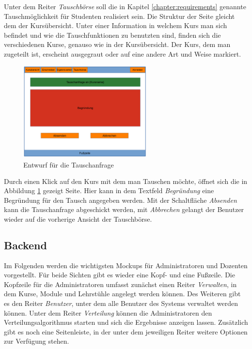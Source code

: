             Unter dem Reiter \textit{Tauschbörse} soll die in Kapitel \ref{chapter:requirements} genannte Tauschmöglichkeit für Studenten realisiert sein.
            Die Struktur der Seite gleicht dem der Kursübersicht.
            Unter einer Information in welchem Kurs man sich befindet und wie die Tauschfunktionen zu benutzten sind, finden sich die verschiedenen Kurse, genauso wie in der Kursübersicht.
            Der Kurs, dem man zugeteilt ist, erscheint ausgegraut oder auf eine andere Art und Weise markiert.
            
            \begin{figure}[t]
            	\centering
            	\includegraphics[width=0.6\textwidth]{./design/images/MockUpsFrontend/frontendSwap2.png}
            	\caption{Entwurf für die Tauschanfrage}
            	\label{fig:mockupResultsSwap2}
            \end{figure}
            
            Durch einen Klick auf den Kurs mit dem man Tauschen möchte, öffnet sich die in Abbildung \ref{fig:mockupResultsSwap2} gezeigt Seite.
            Hier kann in dem Textfeld \textit{Begründung} eine Begründung für den Tausch angegeben werden.
            Mit der Schaltfläche \textit{Absenden} kann die Tauschanfrage abgeschickt werden, mit \textit{Abbrechen} gelangt der Benutzer wieder auf die vorherige Ansicht der Tauschbörse.
            
            
            
        
            
            
    
        \subsection{Backend}
	        Im Folgenden werden die wichtigsten Mockups für Administratoren und Dozenten vorgestellt.
	        Für beide Sichten gibt es wieder eine Kopf- und eine Fußzeile.
	        Die Kopfzeile für die Administratoren umfasst zunächst einen Reiter \textit{Verwalten}, in dem Kurse, Module und Lehrstühle angelegt werden können.
	        Des Weiteren gibt es den Reiter \textit{Benutzer}, unter dem alle Benutzer des Systems verwaltet werden können.
	        Unter dem Reiter \textit{Verteilung} können die Administratoren den Verteilungsalgorithmus starten und sich die Ergebnisse anzeigen lassen.
	        Zusätzlich gibt es noch eine Seitenleiste, in der unter dem jeweiligen Reiter weitere Optionen zur Verfügung stehen.
        	
